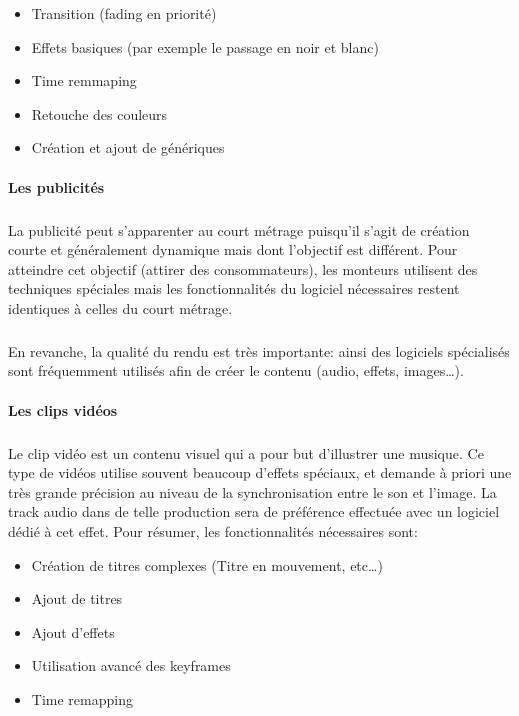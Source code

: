 \begin{itemize} \setlength{\itemsep}{2mm}

  \item{Transition (fading en priorité)}

  \item{Effets basiques (par exemple le passage en noir et blanc)}

  \item{Time remmaping}

  \item{Retouche des couleurs}

  \item{Création et ajout de génériques}

\end{itemize}

\paragraph {Les publicités}

\subparagraph{}

La publicité peut s'apparenter au court métrage puisqu'il s'agit de
création courte et généralement dynamique mais dont l'objectif est
différent.  Pour atteindre cet objectif (attirer des consommateurs),
les monteurs utilisent des techniques spéciales mais les fonctionnalités
du logiciel nécessaires restent identiques à celles du court métrage.

\subparagraph{}

En revanche, la qualité du rendu est très importante: ainsi des
logiciels spécialisés sont fréquemment utilisés afin de créer le
contenu (audio, effets, images\ldots).

\paragraph {Les clips vidéos}

\subparagraph{}

Le clip vidéo est un contenu visuel qui a pour but d'illustrer une
musique. Ce type de vidéos utilise souvent beaucoup d'effets spéciaux,
et demande à priori une très grande précision au niveau de la
synchronisation entre le son et l'image. La track audio dans de telle
production sera de préférence effectuée avec un logiciel dédié à
cet effet. Pour résumer, les fonctionnalités nécessaires sont:

\begin{itemize} \setlength{\itemsep}{2mm}

  \item{Création de titres complexes (Titre en mouvement, etc\ldots)}

  \item{Ajout de titres}

  \item{Ajout d'effets}

  \item{Utilisation avancé des keyframes}

  \item{Time remapping}

\end{itemize}


